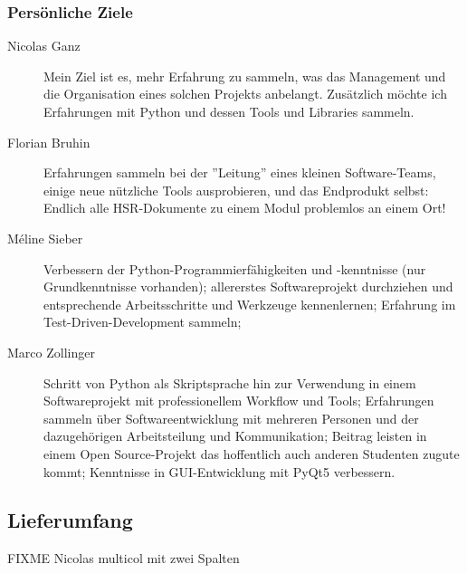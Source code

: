 \documentclass[a4paper]{article}
\begin{document}
\subsubsection{Persönliche Ziele}
\begin{description}
\item[Nicolas Ganz]
  Mein Ziel ist es, mehr Erfahrung zu sammeln, was das Management und die Organisation eines solchen Projekts anbelangt.
  Zusätzlich möchte ich Erfahrungen mit Python und dessen Tools und Libraries sammeln.
\item[Florian Bruhin] Erfahrungen sammeln bei der ''Leitung'' eines kleinen
  Software-Teams, einige neue nützliche Tools ausprobieren, und das Endprodukt
  selbst: Endlich alle HSR-Dokumente zu einem Modul problemlos an einem Ort!
\item[Méline Sieber] Verbessern der Python-Programmierfähigkeiten und -kenntnisse (nur Grundkenntnisse vorhanden); allererstes Softwareprojekt durchziehen und entsprechende Arbeitsschritte und Werkzeuge kennenlernen; Erfahrung im Test-Driven-Development sammeln; 
\item[Marco Zollinger] Schritt von Python als Skriptsprache hin zur Verwendung in einem Softwareprojekt mit professionellem Workflow und Tools; Erfahrungen sammeln über Softwareentwicklung mit mehreren Personen und der dazugehörigen Arbeitsteilung und Kommunikation; Beitrag leisten in einem Open Source-Projekt das hoffentlich auch anderen Studenten zugute kommt; Kenntnisse in GUI-Entwicklung mit PyQt5 verbessern.

\end{description}

\subsection{Lieferumfang}

FIXME Nicolas multicol mit zwei Spalten
\end{document}
